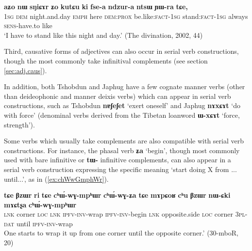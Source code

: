 \documentclass[oneside,a4paper,11pt]{article}
\newcommand{\ipa}[1]{\textbf{\phon#1}} %
\newcommand{\jpg}[2]{\ipa{#1} `#2'} %
\begin{document}
\begin{exe}
\ex \label{ex:ki.fsea}
\gll \ipa{aʑo} 	\ipa{nɯ} 	\ipa{sŋiɕɤr} 	\ipa{ʑo} 	\ipa{kutɕu} 	\ipa{ki} 	\ipa{fse-a} 	\ipa{ndzur-a} 	\ipa{ntsɯ} 	\ipa{ɲɯ-ra} 	\ipa{tɕe,} \\
\textsc{1sg} \textsc{dem} night.and.day \textsc{emph} here \textsc{dem:prox} be.like:\textsc{fact-1sg} stand:\textsc{fact-1sg} always \textsc{sens}-have.to like \\
\glt `I have to stand like this night and day.' (The divination, 2002, 44)
\end{exe}



Third, causative forms of adjectives can also occur in serial verb constructions, though the most commonly take infinitival complements (see section \ref{sec:adj.caus}).

In addition, both Tshobdun and Japhug have a few cognate manner verbs (other than deideophonic and manner deixis verbs) which can appear in serial verb constructions, such as Tshobdun \jpg{nɐʃeʃet}{exert oneself} and Japhug  \jpg{nɤxɕɤt}{do with force}  (denominal verbs derived from the Tibetan loanword \jpg{ɯ-xɕɤt}{force, strength}).

Some verbs which usually take complements are also compatible with serial verb constructions. 
 For instance, the phasal verb \jpg{ʑa}{begin}, though most commonly used with bare infinitive or \ipa{tɯ-} infinitive complements, can also appear in a serial verb construction expressing the specific meaning `start doing X from ... until...', as in (\ref{ex:chWwGmphWr}).

   \begin{exe}
\ex \label{ex:chWwGmphWr}
 \gll  \ipa{tɕe} 	\ipa{βzɯr} 	\ipa{ri} 	\ipa{tɕe} 	\ipa{cʰɯ́-wɣ-mpʰɯr} 	\ipa{cʰɯ́-wɣ-ʑa} 	\ipa{tɕe} 	\ipa{mɤpɕoʁ} 	\ipa{cʰu} 	\ipa{βzɯr} 	\ipa{nɯ-ɕki} 	\ipa{mɤɕtʂa} 	\ipa{cʰɯ́-wɣ-mpʰɯr}  \\
 \textsc{lnk} corner \textsc{loc} \textsc{lnk} \textsc{ipfv-inv-}wrap \textsc{ipfv-inv-}begin \textsc{lnk}  opposite.side \textsc{loc} corner \textsc{3pl-dat} until \textsc{ipfv-inv-}wrap  \\
 \glt  One starts to wrap it up from one corner until the opposite corner.' (30-mboR, 20)
\end{exe}
 
\end{document}
